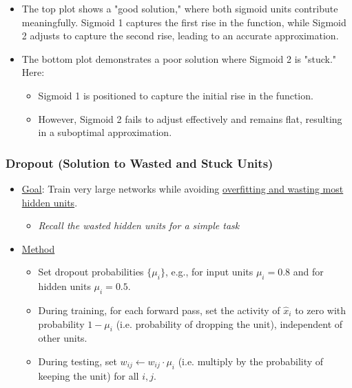 \begin{example}
    \begin{itemize}
        \item The top plot shows a "good solution," where both sigmoid units contribute meaningfully. Sigmoid 1 captures the first rise in the function, while Sigmoid 2 adjusts to capture the second rise, leading to an accurate approximation.
        
        \item The bottom plot demonstrates a poor solution where Sigmoid 2 is "stuck." Here:
            \begin{itemize}
                \item Sigmoid 1 is positioned to capture the initial rise in the function.
                \item However, Sigmoid 2 fails to adjust effectively and remains flat, resulting in a suboptimal approximation.
            \end{itemize}
    \end{itemize}    
\end{example}

\subsubsection{Dropout (Solution to Wasted and Stuck Units)}
\begin{summary}
    \begin{itemize}
        \item \underline{Goal}: Train very large networks while avoiding \underline{overfitting and wasting most hidden units}.
        
        \begin{itemize}
            \item \textit{Recall the wasted hidden units for a simple task}
        \end{itemize}
    
        \item \underline{Method}
        \begin{itemize}
            \item Set dropout probabilities \(\{\mu_i\}\), e.g., for input units \(\mu_i = 0.8\) and for hidden units \(\mu_i = 0.5\).
            \item During training, for each forward pass, set the activity of \(\hat{x}_i\) to zero with probability \(1 - \mu_i\) (i.e. probability of dropping the unit), independent of other units.
            \item During testing, set \( w_{ij} \leftarrow w_{ij} \cdot \mu_i \) (i.e. multiply by the probability of keeping the unit) for all $i,j$.
        \end{itemize}
    \end{itemize}
\end{summary}


